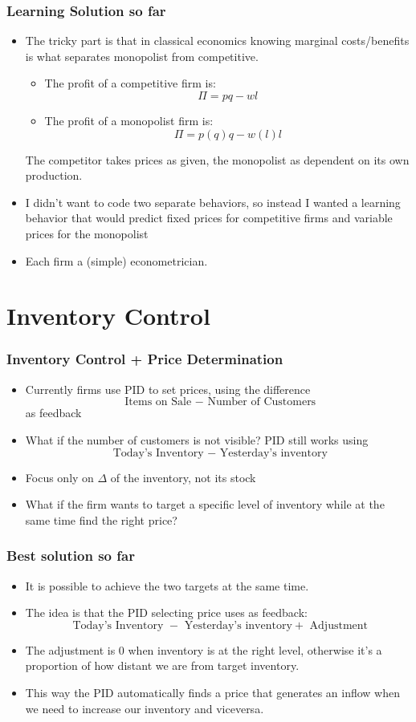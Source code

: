 \documentclass[a4paper,12pt,english]{beamer}
\begin{document}
\begin{frame}
\frametitle{Learning Solution so far}
\pause
\begin{itemize}
\item The tricky part is that in classical economics knowing marginal costs/benefits is what separates monopolist from competitive. 
\pause
\begin{itemize}
\item The profit of a competitive firm is:
\[ \Pi = p q - w l \]
\item The profit of a monopolist firm is:
\[ \Pi = p(q) q - w(l) l \]
\end{itemize}
The competitor takes prices as given, the monopolist as dependent on its own production.
\pause
\item I didn't want to code two separate behaviors, so instead I wanted a learning behavior that would predict fixed prices for competitive firms and variable prices for the monopolist
\pause
\item Each firm a (simple) econometrician.
\end{itemize}
\end{frame}


\section{Inventory Control}

\begin{frame}
\frametitle{Inventory Control + Price Determination}
\begin{itemize}
\item Currently firms use PID to set prices, using the difference
\[ \text{ Items on Sale } - \text{ Number of Customers} \]
as feedback
\pause
\item What if the number of customers is not visible? PID still works using
\[ \text{ Today's Inventory } - \text{ Yesterday's inventory} \]
\pause
\item Focus only on $\Delta$ of the inventory, not its stock
\pause
\item What if the firm wants to target a specific level of inventory while at the same time find the right price?
\end{itemize}
\end{frame}

\begin{frame}
\frametitle{Best solution so far}
\pause
\begin{itemize}
\item It is possible to achieve the two targets at the same time.
\pause
\item The idea is that the PID selecting price uses as feedback:
\[ \text{ Today's Inventory } - \text{ Yesterday's inventory} + \text{ Adjustment} \]
\pause
\item The adjustment is 0 when inventory is at the right level, otherwise it's a proportion of how distant we are from target inventory.
\pause
\item This way the PID automatically finds a price that generates an inflow when we need to increase our inventory and viceversa.
\end{itemize}
\end{frame}
\end{document}
